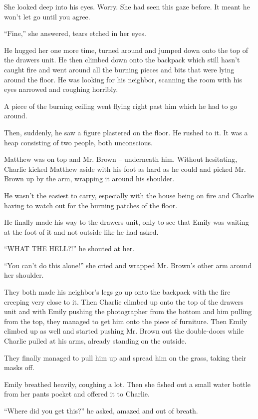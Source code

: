 She looked deep into his eyes. Worry. She had seen this gaze before. It meant he won’t let go until you agree.

“Fine,” she answered, tears etched in her eyes.

He hugged her one more time, turned around and jumped down onto the top of the drawers unit. He then climbed down onto the backpack which still hasn’t caught fire and went around all the burning pieces and bits that were lying around the floor. He was looking for his neighbor, scanning the room with his eyes narrowed and coughing horribly.

A piece of the burning ceiling went flying right past him which he had to go around.

Then, suddenly, he saw a figure plastered on the floor. He rushed to it. It was a heap consisting of two people, both unconscious.

Matthew was on top and Mr. Brown – underneath him. Without hesitating, Charlie kicked Matthew aside with his foot as hard as he could and picked Mr. Brown up by the arm, wrapping it around his shoulder.

He wasn’t the easiest to carry, especially with the house being on fire and Charlie having to watch out for the burning patches of the floor.

He finally made his way to the drawers unit, only to see that Emily was waiting at the foot of it and not outside like he had asked.

“WHAT THE HELL?!” he shouted at her.

“You can’t do this alone!” she cried and wrapped Mr. Brown’s other arm around her shoulder.

They both made his neighbor’s legs go up onto the backpack with the fire creeping very close to it. Then Charlie climbed up onto the top of the drawers unit and with Emily pushing the photographer from the bottom and him pulling from the top, they managed to get him onto the piece of furniture. Then Emily climbed up as well and started pushing Mr. Brown out the double-doors while Charlie pulled at his arms, already standing on the outside.

They finally managed to pull him up and spread him on the grass, taking their masks off.

Emily breathed heavily, coughing a lot. Then she fished out a small water bottle from her pants pocket and offered it to Charlie.

“Where did you get this?” he asked, amazed and out of breath.

